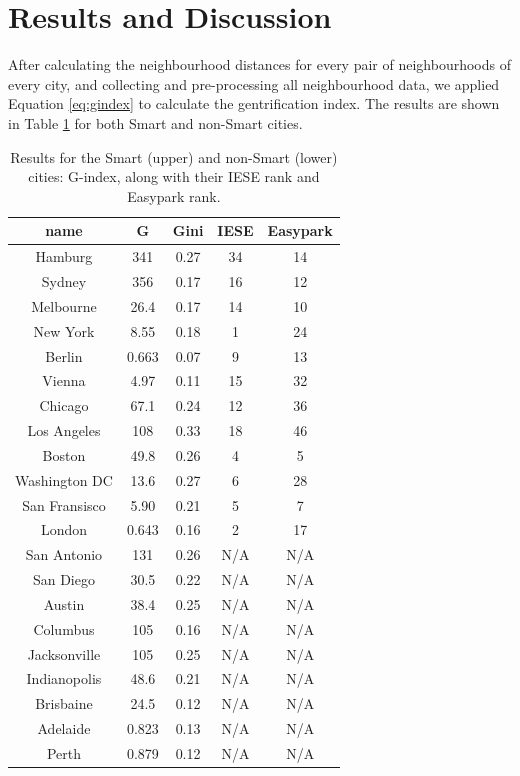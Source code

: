 \documentclass[a4paper, 10pt]{IEEEconf}      %
\begin{document}
\section{Results and Discussion}
\label{sec:Results}
After calculating the neighbourhood distances for every pair of neighbourhoods of every city, and collecting and pre-processing all neighbourhood data, we applied Equation \ref{eq:gindex} to calculate the gentrification index. The results are shown in Table \ref{tab:Results_Smart} for both Smart and non-Smart cities.

\begin{table}[h]
	\begin{centering}
		\begin{tabular}{|c|c|c|c|c|}
			\hline 
			name & G & Gini &  IESE & Easypark \\
			\hline 
			Hamburg & 341 & 0.27 & 34 & 14 \\
			Sydney & 356 &  0.17 & 16 & 12 \\
			Melbourne & 26.4 & 0.17 & 14 & 10 \\
			New York & 8.55 &  0.18 &1 & 24 \\
			Berlin & 0.663 & 0.07 & 9 & 13 \\
			Vienna & 4.97 & 0.11& 15 & 32 \\
			Chicago & 67.1 & 0.24 & 12 & 36 \\
			Los Angeles  & 108 &0.33& 18 & 46 \\ 
			Boston & 49.8  & 0.26 & 4 & 5 \\
			Washington DC & 13.6 & 0.27 & 6 & 28 \\
			San Fransisco & 5.90 & 0.21 &  5 & 7 \\
			London & 0.643 & 0.16 & 2 & 17 \\
			\hline 
			\hline
			San Antonio & 131 & 0.26 & N/A & N/A \\
			San Diego & 30.5 & 0.22 & N/A & N/A \\
			Austin & 38.4 & 0.25 &  N/A & N/A \\
			Columbus & 105 & 0.16 & N/A & N/A\\
			Jacksonville & 105 & 0.25 &  N/A & N/A \\
			Indianopolis & 48.6 & 0.21 & N/A & N/A \\
			Brisbaine & 24.5 & 0.12 & N/A & N/A \\
			Adelaide & 0.823 & 0.13 & N/A & N/A \\
			Perth & 0.879 & 0.12 & N/A & N/A \\
			\hline
		\end{tabular}
		\par\end{centering}
\caption{Results for the Smart (upper) and non-Smart (lower) cities: G-index, along with their IESE rank and Easypark rank.}
\label{tab:Results_Smart}
\end{table}
\end{document}
